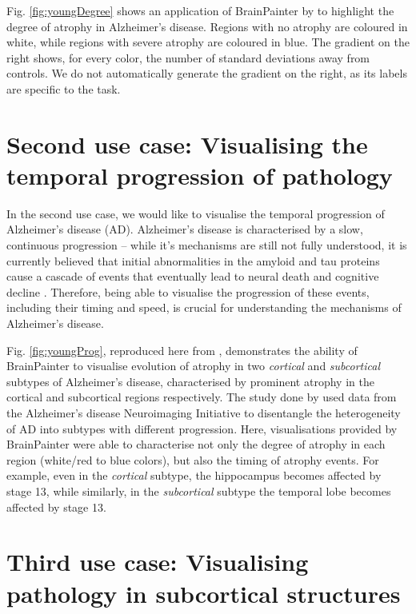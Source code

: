 \documentclass{llncs}
\begin{document}
Fig. \ref{fig:youngDegree} shows an application of BrainPainter by \cite{young2018uncovering} to highlight the degree of atrophy in Alzheimer's disease. Regions with no atrophy are coloured in white, while regions with severe atrophy are coloured in blue. The gradient on the right shows, for every color, the number of standard deviations away from controls. We do not automatically generate the gradient on the right, as its labels are specific to the task. 


\section{Second use case: Visualising the temporal progression of pathology}
\label{progression}

In the second use case, we would like to visualise the temporal progression of Alzheimer's disease (AD). Alzheimer's disease is characterised by a slow, continuous progression -- while it's mechanisms are still not fully understood, it is currently believed that initial abnormalities in the amyloid and tau proteins cause a cascade of events that eventually lead to neural death and cognitive decline \cite{mudher2002alzheimer}. Therefore, being able to visualise the progression of these events, including their timing and speed, is crucial for understanding the mechanisms of Alzheimer's disease. 


Fig. \ref{fig:youngProg}, reproduced here from \cite{young2018uncovering}, demonstrates the ability of BrainPainter to visualise evolution of atrophy in two \emph{cortical} and \emph{subcortical} subtypes of Alzheimer's disease, characterised by prominent atrophy in the cortical and subcortical regions respectively. The study done by \cite{young2018uncovering} used data from the Alzheimer's disease Neuroimaging Initiative to disentangle the heterogeneity of AD into subtypes with different progression. Here, visualisations provided by BrainPainter were able to characterise not only the degree of atrophy in each region (white/red to blue colors), but also the timing of atrophy events. For example, even in the \emph{cortical} subtype, the hippocampus becomes affected by stage 13, while similarly, in the \emph{subcortical} subtype the temporal lobe becomes affected by stage 13. 


\section{Third use case: Visualising pathology in subcortical structures}
\label{progression}
\end{document}
